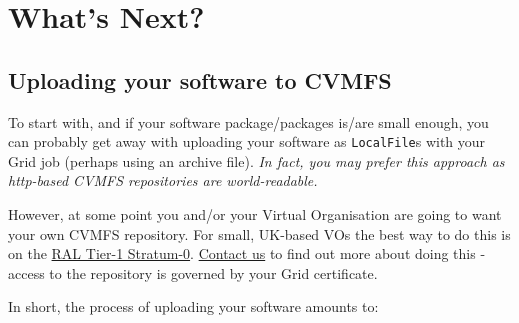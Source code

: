 \section{What's Next?}
\label{sec:whatsnext}

\subsection{Uploading your software to CVMFS}
\label{uploading-your-software-to-cvmfs}
To start with, and if your software package/packages is/are small
enough, you can probably get away with uploading your software as
\texttt{LocalFile}s with your Grid job (perhaps using an archive file).
\emph{In fact, you may prefer this approach as http-based CVMFS repositories
are world-readable.}

However, at some point you and/or your Virtual Organisation are going to
want your own CVMFS repository. For small, UK-based VOs the best way to
do this is on the
\href{https://www.gridpp.ac.uk/wiki/RAL_Tier1_CVMFS}{RAL Tier-1
Stratum-0}. \href{mailto:info@gridpp.ac.uk}{Contact us} to find out more
about doing this - access to the repository is governed by your Grid
certificate.

In short, the process of uploading your software amounts to:

